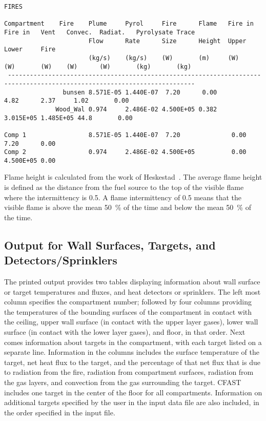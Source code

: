 \begin{lstlisting}[basicstyle=\tiny]
FIRES

Compartment    Fire    Plume     Pyrol     Fire      Flame   Fire in  Fire in   Vent   Convec.  Radiat.   Pyrolysate Trace
                       Flow      Rate      Size      Height  Upper    Lower     Fire
                       (kg/s)    (kg/s)    (W)       (m)     (W)      (W)       (W)    (W)      (W)       (kg)       (kg)
 -------------------------------------------------------------------------------------------------------------------------
                bunsen 8.571E-05 1.440E-07  7.20      0.00                              4.82      2.37     1.02       0.00
              Wood_Wal 0.974     2.486E-02 4.500E+05 0.382                             3.015E+05 1.485E+05 44.8       0.00

Comp 1                 8.571E-05 1.440E-07  7.20              0.00     7.20      0.00
Comp 2                 0.974     2.486E-02 4.500E+05          0.00     4.500E+05 0.00
\end{lstlisting}
Flame height is calculated from the work of Heskestad~\cite{Heskestad:2002}. The average flame height is defined as the distance from the fuel source to the top of the visible flame where the intermittency is 0.5.  A flame intermittency of 0.5 means that the visible flame is above the mean 50~\% of the time and below the mean 50~\% of the time.


\subsection{Output for Wall Surfaces, Targets, and Detectors/Sprinklers}

The printed output provides two tables displaying information about wall surface or target temperatures and fluxes, and heat detectors or sprinklers. The left most column specifies the compartment number; followed by four columns providing the temperatures of the bounding surfaces of the compartment in contact with the ceiling, upper wall surface (in contact with the upper layer gases), lower wall surface (in contact with the lower layer gases), and floor, in that order. Next comes information about targets in the compartment, with each target listed on a separate line.  Information in the columns includes the surface temperature of the target, net heat flux to the target, and the percentage of that net flux that is due to radiation from the fire, radiation from compartment surfaces, radiation from the gas layers, and convection from the gas surrounding the target.  CFAST includes one target in the center of the floor for all compartments. Information on additional targets specified by the user in the input data file are also included, in the order specified in the input file.

